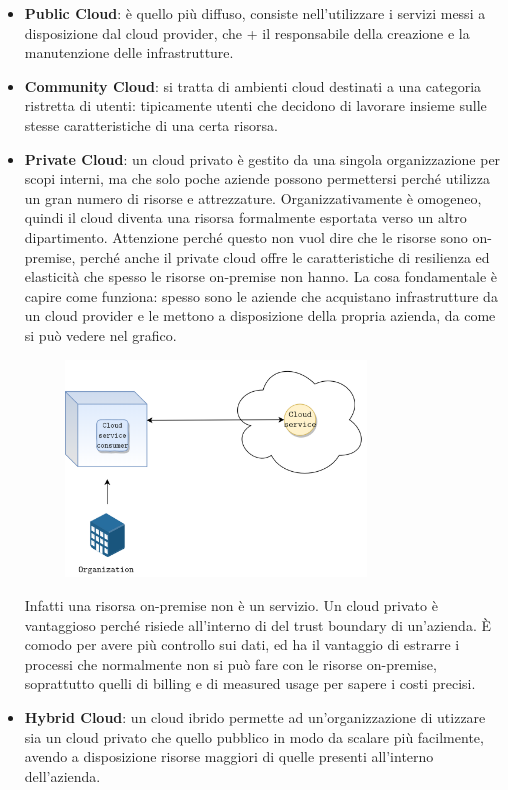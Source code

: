 \begin{itemize}
    \item \textbf{Public Cloud}: è quello più diffuso, consiste nell'utilizzare i servizi messi a disposizione dal cloud provider, che + il responsabile della creazione e la manutenzione delle infrastrutture.
    \item \textbf{Community Cloud}: si tratta di ambienti cloud destinati a una categoria ristretta di utenti: tipicamente utenti che decidono di lavorare insieme sulle stesse caratteristiche di una certa risorsa.
    \item \textbf{Private Cloud}: un cloud privato è gestito da una singola organizzazione per scopi interni, ma che solo poche aziende possono permettersi perché utilizza un gran numero di risorse e attrezzature. Organizzativamente è omogeneo, quindi il cloud diventa una risorsa formalmente esportata verso un altro dipartimento. Attenzione perché questo non vuol dire che le risorse sono on-premise, perché anche il private cloud offre le caratteristiche di resilienza ed elasticità che spesso le risorse on-premise non hanno. La cosa fondamentale è capire come funziona: spesso sono le aziende che acquistano infrastrutture da un cloud provider e le mettono a disposizione della propria azienda, da come si può vedere nel grafico.
    
    \begin{figure}[ht]
    \centering
    \includegraphics[width=8cm]{./Images/cap3/3.6.png}
    \label{fig:image3.6}
    \end{figure}
    
    Infatti una risorsa on-premise non è un servizio. Un cloud privato è vantaggioso perché risiede all'interno di del trust boundary di un'azienda. È comodo per avere più controllo sui dati, ed ha il vantaggio di estrarre i processi che normalmente non si può fare con le risorse on-premise, soprattutto quelli di billing e di measured usage per sapere i costi precisi.
    
    \item \textbf{Hybrid Cloud}: un cloud ibrido permette ad un'organizzazione di utizzare sia un cloud privato che quello pubblico in modo da scalare più facilmente, avendo a disposizione risorse maggiori di quelle presenti all'interno dell'azienda. 
\end{itemize}


